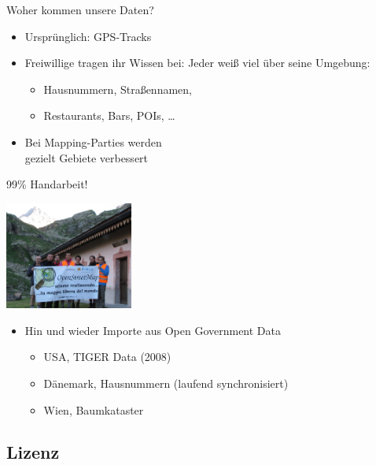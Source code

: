 \documentclass{beamer}
\begin{document}
\begin{frame}{Woher kommen unsere Daten?}

\begin{itemize}
  \item Ursprünglich: GPS-Tracks
  \item Freiwillige tragen ihr Wissen bei: Jeder weiß viel über seine Umgebung:
  \begin{itemize}
    \item Hausnummern, Straßennamen,
    \item Restaurants, Bars, POIs, \dots
  \end{itemize}
  \pause
  \item Bei Mapping-Parties werden \\ gezielt Gebiete verbessert
\end{itemize}

  \vspace{0.4cm}
 99\% Handarbeit!

  \vspace*{-2.9cm}
 \hfill \includegraphics[width=4.2cm]{alps_mp.jpg}


  \pause
\begin{itemize}
  \item Hin und wieder Importe aus Open Government Data
  \begin{itemize}
    \item USA, TIGER Data (2008)
    \item Dänemark, Hausnummern (laufend synchronisiert)
    \item Wien, Baumkataster
  \end{itemize}
\end{itemize}

\end{frame}

\subsection{Lizenz}
\end{document}
